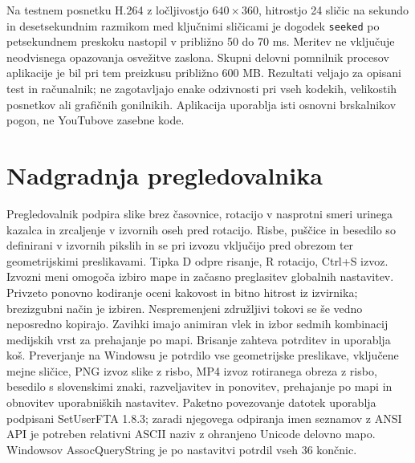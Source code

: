 \documentclass[12pt,a4paper]{article}
\begin{document}
Na testnem posnetku H.264 z ločljivostjo $640\times360$, hitrostjo 24 sličic na sekundo in desetsekundnim razmikom med ključnimi sličicami je dogodek \texttt{seeked} po petsekundnem preskoku nastopil v približno 50 do 70 ms. Meritev ne vključuje neodvisnega opazovanja osvežitve zaslona. Skupni delovni pomnilnik procesov aplikacije je bil pri tem preizkusu približno 600 MB. Rezultati veljajo za opisani test in računalnik; ne zagotavljajo enake odzivnosti pri vseh kodekih, velikostih posnetkov ali grafičnih gonilnikih. Aplikacija uporablja isti osnovni brskalnikov pogon, ne YouTubove zasebne kode.


\section*{Nadgradnja pregledovalnika}
Pregledovalnik podpira slike brez časovnice, rotacijo v nasprotni smeri urinega kazalca in zrcaljenje v izvornih oseh pred rotacijo. Risbe, puščice in besedilo so definirani v izvornih pikslih in se pri izvozu vključijo pred obrezom ter geometrijskimi preslikavami. Tipka D odpre risanje, R rotacijo, Ctrl+S izvoz. Izvozni meni omogoča izbiro mape in začasno preglasitev globalnih nastavitev. Privzeto ponovno kodiranje oceni kakovost in bitno hitrost iz izvirnika; brezizgubni način je izbiren. Nespremenjeni združljivi tokovi se še vedno neposredno kopirajo. Zavihki imajo animiran vlek in izbor sedmih kombinacij medijskih vrst za prehajanje po mapi. Brisanje zahteva potrditev in uporablja koš. Preverjanje na Windowsu je potrdilo vse geometrijske preslikave, vključene mejne sličice, PNG izvoz slike z risbo, MP4 izvoz rotiranega obreza z risbo, besedilo s slovenskimi znaki, razveljavitev in ponovitev, prehajanje po mapi in obnovitev uporabniških nastavitev. Paketno povezovanje datotek uporablja podpisani SetUserFTA 1.8.3; zaradi njegovega odpiranja imen seznamov z ANSI API je potreben relativni ASCII naziv z ohranjeno Unicode delovno mapo. Windowsov AssocQueryString je po nastavitvi potrdil vseh 36 končnic.
\end{document}
